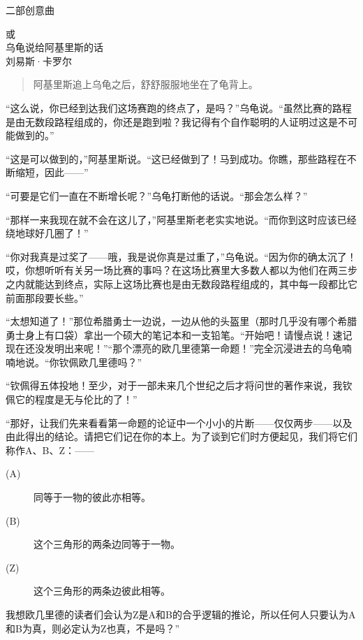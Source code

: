 
\begin{dialog}{二部创意曲}

\removelastskip
\bigskip

\begin{center}
或\\[\bigskipamount]\nointerlineskip
{\kaishu\large 乌龟说给阿基里斯的话}\\[\medskipamount]
刘易斯·卡罗尔
\end{center}

\bigskip

\begin{quote}
阿基里斯追上乌龟之后，舒舒服服地坐在了龟背上。
\end{quote}

“这么说，你已经到达我们这场赛跑的终点了，是吗？”乌龟说。“虽然比赛的路程是由无数段路程组成的，你还是跑到啦？我记得有个自作聪明的人证明过这是不可能做到的。”

“这是可以做到的，”阿基里斯说。“这已经做到了！马到成功。你瞧，那些路程在不断缩短，因此——”

“可要是它们一直在不断增长呢？”乌龟打断他的话说。“那会怎么样？”

“那样一来我现在就不会在这儿了，”阿基里斯老老实实地说。“而你到这时应该已经绕地球好几圈了！”

“你对我真是过奖了——哦，我是说你真是过重了，”乌龟说。“因为你的确太沉了！哎，你想听听有关另一场比赛的事吗？在这场比赛里大多数人都以为他们在两三步之内就能达到终点，实际上这场比赛也是由无数段路程组成的，其中每一段都比它前面那段要长些。”

“太想知道了！”那位希腊勇士一边说，一边从他的头盔里（那时几乎没有哪个希腊勇士身上有口袋）拿出一个硕大的笔记本和一支铅笔。“开始吧！请慢点说！速记现在还没发明出来呢！”“那个漂亮的欧几里德第一命题！”完全沉浸进去的乌龟喃喃地说。“你钦佩欧几里德吗？”

“钦佩得五体投地！至少，对于一部未来几个世纪之后才将问世的著作来说，我钦佩它的程度是无与伦比的了！”

“那好，让我们先来看看第一命题的论证中一个小小的片断——仅仅两步——以及由此得出的结论。请把它们记在你的本上。为了谈到它们时方便起见，我们将它们称作A、B、Z：——
\begin{description}
\item[(A)] 同等于一物的彼此亦相等。
\item[(B)] 这个三角形的两条边同等于一物。
\item[(Z)] 这个三角形的两条边彼此相等。
\end{description}
我想欧几里德的读者们会认为Z是A和B的合乎逻辑的推论，所以任何人只要认为A和B为真，则必定认为Z也真，不是吗？”


\end{dialog}
